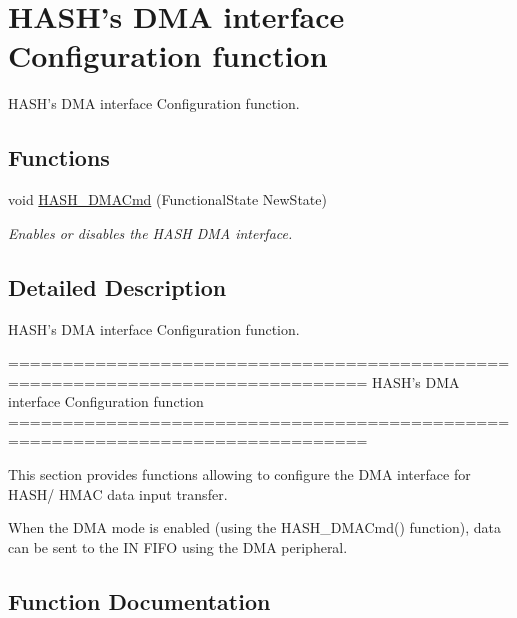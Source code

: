 \hypertarget{group___h_a_s_h___group4}{}\section{H\+A\+S\+H's D\+M\+A interface Configuration function}
\label{group___h_a_s_h___group4}


H\+A\+S\+H's D\+M\+A interface Configuration function.  


\subsection*{Functions}
\begin{DoxyCompactItemize}
\item 
void \hyperlink{group___h_a_s_h___group4_ga6bc756803b0b3a03eecc47cb570e1bd3}{H\+A\+S\+H\+\_\+\+D\+M\+A\+Cmd} (Functional\+State New\+State)
\begin{DoxyCompactList}\small\item\em Enables or disables the H\+A\+S\+H D\+M\+A interface. \end{DoxyCompactList}\end{DoxyCompactItemize}


\subsection{Detailed Description}
H\+A\+S\+H's D\+M\+A interface Configuration function. 

\begin{DoxyVerb} ===============================================================================
                   HASH's DMA interface Configuration function
 ===============================================================================  

  This section provides functions allowing to configure the DMA interface for 
  HASH/ HMAC data input transfer.
   
  When the DMA mode is enabled (using the HASH_DMACmd() function), data can be 
  sent to the IN FIFO using the DMA peripheral.\end{DoxyVerb}
 

\subsection{Function Documentation}
\hypertarget{group___h_a_s_h___group4_ga6bc756803b0b3a03eecc47cb570e1bd3}{}
